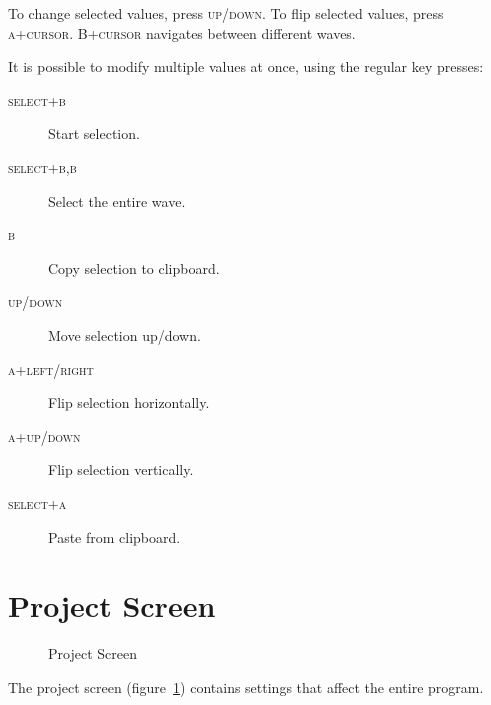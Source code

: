 To change selected values, press \textsc{up/down}. To flip selected values, press \textsc{a+cursor}. \textsc{B+cursor} navigates between different waves.

It is possible to modify multiple values at once, using the regular key presses:

\begin{description}
	\item[\textsc{select+b}] Start selection.
	\item[\textsc{select+b,b}] Select the entire wave.
	\item[\textsc{b}] Copy selection to clipboard.
	\item[\textsc{up/down}] Move selection up/down.
	\item[\textsc{a+left/right}] Flip selection horizontally.
	\item[\textsc{a+up/down}] Flip selection vertically.
	\item[\textsc{select+a}] Paste from clipboard.
\end{description}

\section{Project Screen}

\begin{figure}[htpb]
	\begin{center}
	\end{center}
	\caption{Project Screen}
	\label{fig:project}
\end{figure}

The project screen (figure~\ref{fig:project}) contains settings that affect the entire program.


